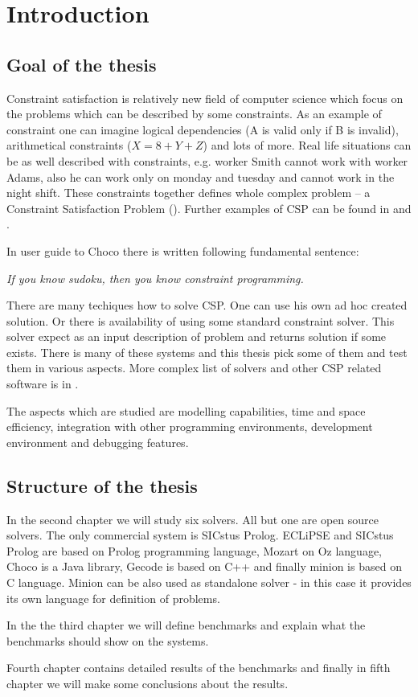 \chapter{Introduction}
\thispagestyle{myheadings}

\section{Goal of the thesis}
Constraint satisfaction is relatively new field of computer science which focus on the problems
which can be described by some constraints. As an example of constraint one can imagine logical dependencies 
(A is valid only if B is invalid), arithmetical constraints ($X = 8 + Y + Z$) and lots of more. Real life situations can 
be as well described with constraints, e.g. worker Smith cannot work with worker Adams, also he can work only 
on monday and tuesday and cannot work in the night shift. These constraints together defines whole
complex problem -- a Constraint Satisfaction Problem ().
Further examples of CSP can be found in \cite{csplib} and \cite{Apt2003}.

In user guide to Choco there is written following fundamental sentence:

\begin{center}
\em If you know sudoku, then you know constraint programming.
\end{center}

There are many techiques how to solve CSP. One can use his own ad hoc created solution. 
Or there is availability of using some standard constraint solver. This solver expect
as an input description of problem and returns solution if some exists. There is many 
of these systems and this thesis pick some of them and test them in various aspects.
More complex list of solvers and other CSP related software is in \cite{bartak:los}.

The aspects which are studied are modelling capabilities, time and space efficiency, 
integration with other programming environments, development environment and debugging features. 

\section{Structure of the thesis}

In the second chapter we will study six solvers. All but one are open source solvers. 
The only commercial system is SICstus Prolog. ECLiPSE and SICstus Prolog are based on Prolog
programming language, Mozart on Oz language, Choco is a Java library, Gecode is based on C++ and finally 
minion is based on C language. Minion can be also used as standalone solver - in this 
case it provides its own language for definition of problems.

In the the third chapter we will define benchmarks and explain what the benchmarks
should show on the systems.

Fourth chapter contains detailed results of the benchmarks and finally in fifth chapter 
we will make some conclusions about the results.
